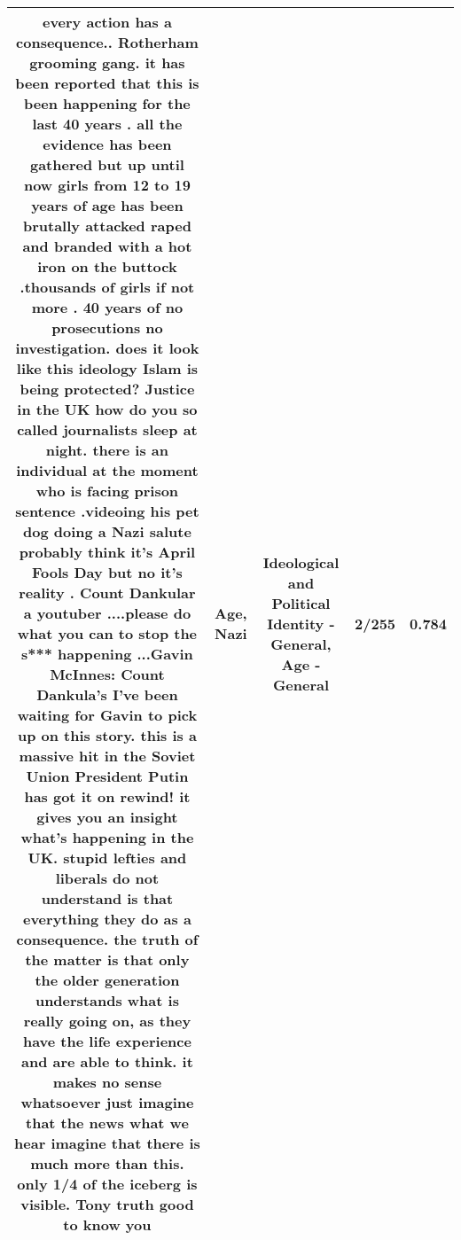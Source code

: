 \documentclass[11pt]{article}
\newlength\mylength
\begin{document}
\begin{center}
\begin{longtable}{|C{.65\mylength}|C{.30\mylength}|C{.12\mylength}|C{.12\mylength}|C{.12\mylength}|}
  \small every action has a consequence.. Rotherham grooming gang. it has been reported that this is been happening for the last 40 years . all the evidence has been gathered but up until now girls from 12 to 19 years of \textbf{age} has been brutally attacked raped and branded with a hot iron on the buttock .thousands of girls if not more . 40 years of no prosecutions no investigation. does it look like this ideology Islam is being protected?  Justice in the UK how do you so called journalists sleep at night.  there is an individual at the moment who is facing prison sentence .videoing his pet dog doing a \textbf{Nazi} salute probably think it's April Fools Day but no it's reality . Count Dankular  a youtuber ....please do what you can to stop the s*** happening  ...Gavin McInnes: Count Dankula's  I've been waiting for Gavin to pick up on this story. this is a massive hit in the Soviet Union President Putin has got it on rewind! it gives you an insight what's happening in the UK.  stupid lefties and liberals do not understand is that everything they do as a consequence.  the truth of the matter is that only the older generation understands  what is really going on, as they have the life experience and are able to think. it makes no sense whatsoever just imagine that the news what we hear imagine that there is much more than this. only 1/4 of the iceberg is visible. Tony truth good to know you\normalsize   & Age, Nazi &  Ideological and Political Identity - General, Age - General & 2/255 & 0.784 \\  \hline

\end{longtable}
\end{center}
\end{document}
